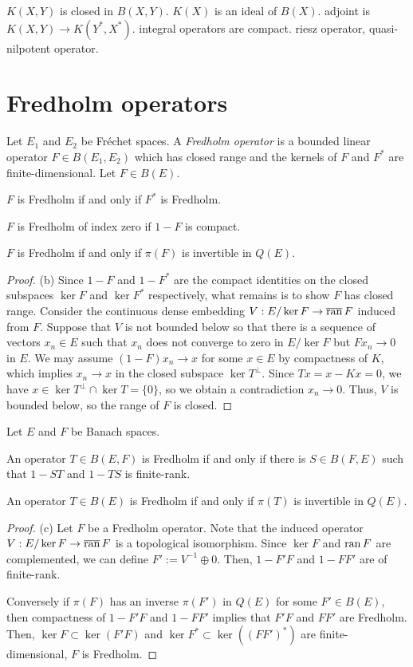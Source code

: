 \documentclass{../../large}
\begin{document}
$K(X,Y)$ is closed in $B(X,Y)$.
$K(X)$ is an ideal of $B(X)$.
adjoint is $K(X,Y)\to K(Y^*,X^*)$.
integral operators are compact.
riesz operator, quasi-nilpotent operator.




\section{Fredholm operators}

\begin{prb}
Let $E_1$ and $E_2$ be Fr\'echet spaces.
A \emph{Fredholm operator} is a bounded linear operator $F\in B(E_1,E_2)$ which has closed range and the kernels of $F$ and $F^*$ are finite-dimensional.
Let $F\in B(E)$.
\begin{parts}
\item $F$ is Fredholm if and only if $F^*$ is Fredholm.
\item $F$ is Fredholm of index zero if $1-F$ is compact.
\item $F$ is Fredholm if and only if $\pi(F)$ is invertible in $Q(E)$.
\end{parts}
\end{prb}
\begin{proof}
(b)
Since $1-F$ and $1-F^*$ are the compact identities on the closed subspaces $\ker F$ and $\ker F^*$ respectively, what remains is to show $F$ has closed range.
Consider the continuous dense embedding $V:E/\ker F\to\overline{\operatorname{ran}}\,F$ induced from $F$.
Suppose that $V$ is not bounded below so that there is a sequence of vectors $x_n\in E$ such that $x_n$ does not converge to zero in $E/\ker F$ but $Fx_n\to0$ in $E$.
We may assume $(1-F)x_n\to x$ for some $x\in E$ by compactness of $K$, which implies $x_n\to x$ in the closed subspace $\ker T^\perp$.
Since $Tx=x-Kx=0$, we have $x\in\ker T^\perp\cap\ker T=\{0\}$, so we obtain a contradiction $x_n\to0$.
Thus, $V$ is bounded below, so the range of $F$ is closed.
\end{proof}

\begin{prb}
Let $E$ and $F$ be Banach spaces.
\begin{parts}
\item An operator $T\in B(E,F)$ is Fredholm if and only if there is $S\in B(F,E)$ such that $1-ST$ and $1-TS$ is finite-rank.
\item An operator $T\in B(E)$ is Fredholm if and only if $\pi(T)$ is invertible in $Q(E)$.
\end{parts}
\end{prb}
\begin{proof}
(c)
Let $F$ be a Fredholm operator.
Note that the induced operator $V:E/\ker F\to\overline{\operatorname{ran}}\,F$ is a topological isomorphism.
Since $\ker F$ and $\operatorname{ran} F$ are complemented, we can define $F':=V^{-1}\oplus0$.
Then, $1-F'F$ and $1-FF'$ are of finite-rank.

Conversely if $\pi(F)$ has an inverse $\pi(F')$ in $Q(E)$ for some $F'\in B(E)$, then compactness of $1-F'F$ and $1-FF'$ implies that $F'F$ and $FF'$ are Fredholm.
Then, $\ker F\subset\ker(F'F)$ and $\ker F^*\subset\ker((FF')^*)$ are finite-dimensional, $F$ is Fredholm.
\end{proof}
\end{document}
